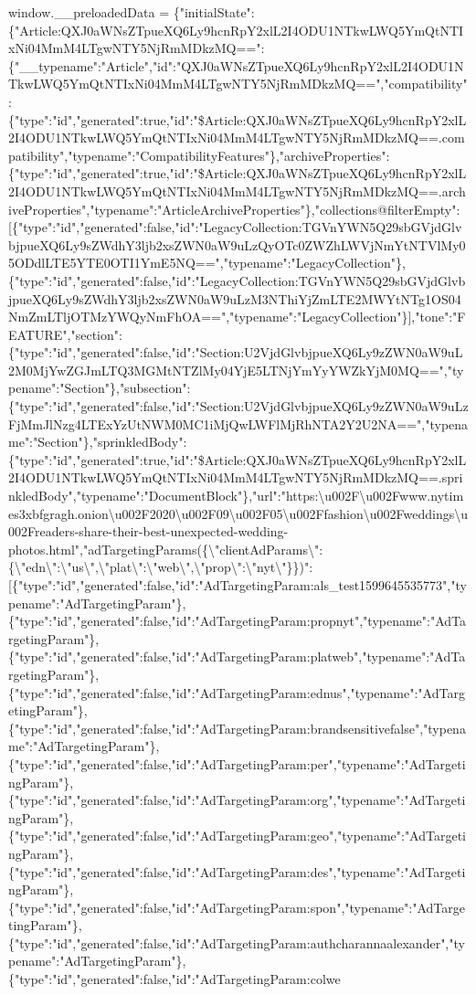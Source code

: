 window.\_\_preloadedData =
\{"initialState":\{"Article:QXJ0aWNsZTpueXQ6Ly9hcnRpY2xlL2I4ODU1NTkwLWQ5YmQtNTIxNi04MmM4LTgwNTY5NjRmMDkzMQ==":\{"\_\_typename":"Article","id":"QXJ0aWNsZTpueXQ6Ly9hcnRpY2xlL2I4ODU1NTkwLWQ5YmQtNTIxNi04MmM4LTgwNTY5NjRmMDkzMQ==","compatibility":\{"type":"id","generated":true,"id":"\$Article:QXJ0aWNsZTpueXQ6Ly9hcnRpY2xlL2I4ODU1NTkwLWQ5YmQtNTIxNi04MmM4LTgwNTY5NjRmMDkzMQ==.compatibility","typename":"CompatibilityFeatures"\},"archiveProperties":\{"type":"id","generated":true,"id":"\$Article:QXJ0aWNsZTpueXQ6Ly9hcnRpY2xlL2I4ODU1NTkwLWQ5YmQtNTIxNi04MmM4LTgwNTY5NjRmMDkzMQ==.archiveProperties","typename":"ArticleArchiveProperties"\},"collections@filterEmpty":{[}\{"type":"id","generated":false,"id":"LegacyCollection:TGVnYWN5Q29sbGVjdGlvbjpueXQ6Ly9sZWdhY3ljb2xsZWN0aW9uLzQyOTc0ZWZhLWVjNmYtNTVlMy05ODdlLTE5YTE0OTI1YmE5NQ==","typename":"LegacyCollection"\},\{"type":"id","generated":false,"id":"LegacyCollection:TGVnYWN5Q29sbGVjdGlvbjpueXQ6Ly9sZWdhY3ljb2xsZWN0aW9uLzM3NThiYjZmLTE2MWYtNTg1OS04NmZmLTljOTMzYWQyNmFhOA==","typename":"LegacyCollection"\}{]},"tone":"FEATURE","section":\{"type":"id","generated":false,"id":"Section:U2VjdGlvbjpueXQ6Ly9zZWN0aW9uL2M0MjYwZGJmLTQ3MGMtNTZlMy04YjE5LTNjYmYyYWZkYjM0MQ==","typename":"Section"\},"subsection":\{"type":"id","generated":false,"id":"Section:U2VjdGlvbjpueXQ6Ly9zZWN0aW9uLzFjMmJlNzg4LTExYzUtNWM0MC1iMjQwLWFlMjRhNTA2Y2U2NA==","typename":"Section"\},"sprinkledBody":\{"type":"id","generated":true,"id":"\$Article:QXJ0aWNsZTpueXQ6Ly9hcnRpY2xlL2I4ODU1NTkwLWQ5YmQtNTIxNi04MmM4LTgwNTY5NjRmMDkzMQ==.sprinkledBody","typename":"DocumentBlock"\},"url":"https:\textbackslash{}u002F\textbackslash{}u002Fwww.nytimes3xbfgragh.onion\textbackslash{}u002F2020\textbackslash{}u002F09\textbackslash{}u002F05\textbackslash{}u002Ffashion\textbackslash{}u002Fweddings\textbackslash{}u002Freaders-share-their-best-unexpected-wedding-photos.html","adTargetingParams(\{\textbackslash{}"clientAdParams\textbackslash{}":\{\textbackslash{}"edn\textbackslash{}":\textbackslash{}"us\textbackslash{}",\textbackslash{}"plat\textbackslash{}":\textbackslash{}"web\textbackslash{}",\textbackslash{}"prop\textbackslash{}":\textbackslash{}"nyt\textbackslash{}"\}\})":{[}\{"type":"id","generated":false,"id":"AdTargetingParam:als\_test1599645535773","typename":"AdTargetingParam"\},\{"type":"id","generated":false,"id":"AdTargetingParam:propnyt","typename":"AdTargetingParam"\},\{"type":"id","generated":false,"id":"AdTargetingParam:platweb","typename":"AdTargetingParam"\},\{"type":"id","generated":false,"id":"AdTargetingParam:ednus","typename":"AdTargetingParam"\},\{"type":"id","generated":false,"id":"AdTargetingParam:brandsensitivefalse","typename":"AdTargetingParam"\},\{"type":"id","generated":false,"id":"AdTargetingParam:per","typename":"AdTargetingParam"\},\{"type":"id","generated":false,"id":"AdTargetingParam:org","typename":"AdTargetingParam"\},\{"type":"id","generated":false,"id":"AdTargetingParam:geo","typename":"AdTargetingParam"\},\{"type":"id","generated":false,"id":"AdTargetingParam:des","typename":"AdTargetingParam"\},\{"type":"id","generated":false,"id":"AdTargetingParam:spon","typename":"AdTargetingParam"\},\{"type":"id","generated":false,"id":"AdTargetingParam:authcharannaalexander","typename":"AdTargetingParam"\},\{"type":"id","generated":false,"id":"AdTargetingParam:colwe